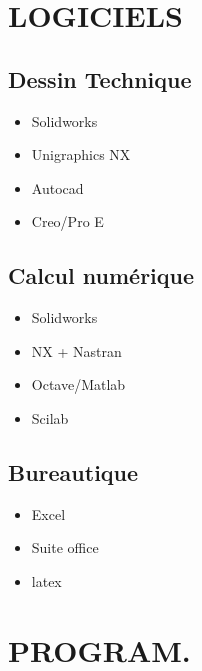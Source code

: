 \documentclass[10pt,a4paper,sans]{article}
\begin{document}
\begin{minipage}[t]{0.25\textwidth}
    \begin{mdframed}[style=cadreCompetences]
        \section{LOGICIELS}
        \subsection{Dessin Technique}
        \begin{itemize}
            \item{Solidworks}
            \item{Unigraphics NX}
            \item{Autocad}
            \item{Creo/Pro E}
        \end{itemize}

        \subsection{Calcul numérique}
            \begin{itemize}
                \item{Solidworks}
                \item{NX + Nastran}
                \item{Octave/Matlab}
                \item{Scilab}
            \end{itemize}
        \subsection{Bureautique}
            \begin{itemize}
                \item{Excel}
                \item{Suite office}
                \item{latex}
            \end{itemize}

        \section{PROGRAM.}

\end{mdframed}
\end{minipage}
\end{document}
